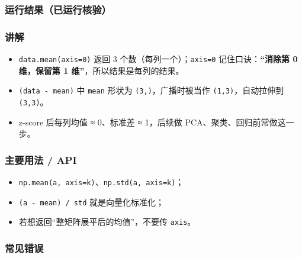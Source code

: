 \subsubsection{运行结果（已运行核验）}\label{ux8fd0ux884cux7ed3ux679cux5df2ux8fd0ux884cux6838ux9a8c-1}

\begin{Shaded}
\begin{Highlighting}[]
\NormalTok{[[ 1.2247  1.2247  1.2247]}
\NormalTok{ [ 0.      0.      0.    ]}
\NormalTok{ [{-}1.2247 {-}1.2247 {-}1.2247]]}
\end{Highlighting}
\end{Shaded}

\subsubsection{讲解}\label{ux8bb2ux89e3-1}

\begin{itemize}
\tightlist
\item
  \texttt{data.mean(axis=0)} 返回 3 个数（每列一个）；\texttt{axis=0}
  记住口诀：\textbf{``消除第 0 维，保留第 1
  维''}，所以结果是每列的结果。
\item
  \texttt{(data\ -\ mean)} 中 \texttt{mean} 形状为
  \texttt{(3,)}，广播时被当作 \texttt{(1,3)}，自动拉伸到
  \texttt{(3,3)}。
\item
  z-score 后每列均值 ≈ 0、标准差 ≈ 1，后续做
  PCA、聚类、回归前常做这一步。
\end{itemize}

\subsubsection{主要用法 / API}\label{ux4e3bux8981ux7528ux6cd5-api-1}

\begin{itemize}
\tightlist
\item
  \texttt{np.mean(a,\ axis=k)}、\texttt{np.std(a,\ axis=k)}；
\item
  \texttt{(a\ -\ mean)\ /\ std} 就是向量化标准化；
\item
  若想返回``整矩阵展平后的均值''，不要传 \texttt{axis}。
\end{itemize}

\subsubsection{常见错误}\label{ux5e38ux89c1ux9519ux8bef-1}

